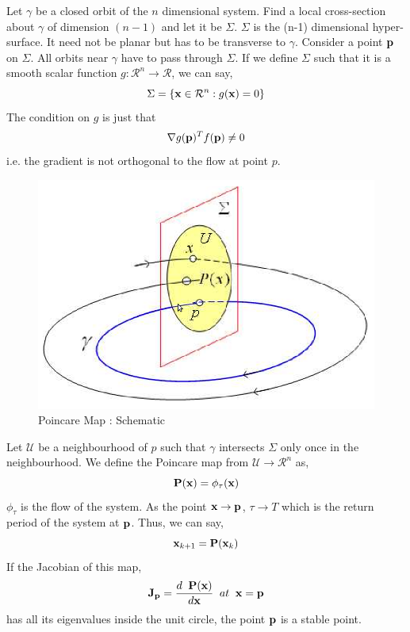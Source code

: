 Let $\gamma$ be a closed orbit of the $n$ dimensional system. Find a local cross-section about $\gamma$ of dimension $(n-1)$ and let it be $\Sigma$. $\Sigma$ is the (n-1) dimensional hyper-surface. It need not be planar but has to be transverse to $\gamma$. Consider a point $\bf p$ on $\Sigma$. All orbits near $\gamma$ have to pass through $\Sigma$. If we define $\Sigma$ such that it is a smooth scalar function $g : \mathcal{R}^n \to \mathcal{R}$, we can say,
\begin{equation}
\Sigma = \lbrace {\bf x} \in \mathcal{R}^n : g({\bf x}) = 0 \rbrace
\end{equation}
The condition on $g$ is just that
\begin{equation}
\nabla g({\bf p})^T f({\bf p}) \neq 0 
\end{equation}
i.e. the gradient is not orthogonal to the flow at point $p$. 
\begin{figure}[!htp]
\centering
\includegraphics[scale=1.4]{fig/poincare.png}
\caption[Poincare Map : Schematic]{Poincare Map : Schematic \cite{sayyad}}
\label{fig:4_poincare}
\end{figure}
Let $\mathcal{U}$ be a neighbourhood of $p$ such that $\gamma$ intersects $\Sigma$ only once in the neighbourhood. We define the Poincare map from $\mathcal{U} \to \mathcal{R}^n$ as,
\begin{equation}
{\bf P (x)} = \phi_{\tau}({\bf x})
\end{equation}
$\phi_{\tau}$ is the flow of the system. As the point ${\bf x} \to {\bf p}$, $\tau \to T$ which is the return period of the system at ${\bf p}$. Thus, we can say,
\begin{equation}
{\bf x}_{k+1} = {\bf P} ({\bf x}_k)
\end{equation}
If the Jacobian of this map,
\begin{equation}
{\bf J}_{\bf p} = \frac{d\;\;{\bf P(x)}}{d {\bf x}}\;\;at\;\;{\bf x = p}
\end{equation}
has all its eigenvalues inside the unit circle, the point $\bf p$ is a stable point.\\

